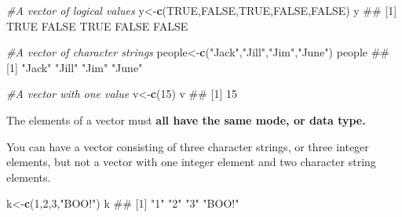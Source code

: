\documentclass[ignorenonframetext,]{beamer}
\newenvironment{Shaded}{\begin{snugshade}}{\end{snugshade}}
\newcommand{\KeywordTok}[1]{\textcolor[rgb]{0.13,0.29,0.53}{\textbf{#1}}}
\newcommand{\DecValTok}[1]{\textcolor[rgb]{0.00,0.00,0.81}{#1}}
\newcommand{\StringTok}[1]{\textcolor[rgb]{0.31,0.60,0.02}{#1}}
\newcommand{\CommentTok}[1]{\textcolor[rgb]{0.56,0.35,0.01}{\textit{#1}}}
\newcommand{\OtherTok}[1]{\textcolor[rgb]{0.56,0.35,0.01}{#1}}
\newcommand{\NormalTok}[1]{#1}
\begin{document}
\begin{frame}[fragile]

\begin{Shaded}
\begin{Highlighting}[]
\CommentTok{#A vector of logical values}
\NormalTok{y<-}\KeywordTok{c}\NormalTok{(}\OtherTok{TRUE}\NormalTok{,}\OtherTok{FALSE}\NormalTok{,}\OtherTok{TRUE}\NormalTok{,}\OtherTok{FALSE}\NormalTok{,}\OtherTok{FALSE}\NormalTok{)}
\NormalTok{y}
\NormalTok{## [1]  TRUE FALSE  TRUE FALSE FALSE}
\end{Highlighting}
\end{Shaded}

\begin{Shaded}
\begin{Highlighting}[]
\CommentTok{#A vector of character strings}
\NormalTok{people<-}\KeywordTok{c}\NormalTok{(}\StringTok{"Jack"}\NormalTok{,}\StringTok{"Jill"}\NormalTok{,}\StringTok{"Jim"}\NormalTok{,}\StringTok{"June"}\NormalTok{)}
\NormalTok{people}
\NormalTok{## [1] "Jack" "Jill" "Jim"  "June"}
\end{Highlighting}
\end{Shaded}

\begin{Shaded}
\begin{Highlighting}[]
\CommentTok{#A vector with one value}
\NormalTok{v<-}\KeywordTok{c}\NormalTok{(}\DecValTok{15}\NormalTok{)}
\NormalTok{v}
\NormalTok{## [1] 15}
\end{Highlighting}
\end{Shaded}

\end{frame}

\begin{frame}[fragile]

The elements of a vector must \textbf{all have the same mode, or data
type.}

You can have a vector consisting of three character strings, or three
integer elements, but not a vector with one integer element and two
character string elements.

\begin{Shaded}
\begin{Highlighting}[]
\NormalTok{k<-}\KeywordTok{c}\NormalTok{(}\DecValTok{1}\NormalTok{,}\DecValTok{2}\NormalTok{,}\DecValTok{3}\NormalTok{,}\StringTok{"BOO!"}\NormalTok{)}
\NormalTok{k}
\NormalTok{## [1] "1"    "2"    "3"    "BOO!"}
\end{Highlighting}
\end{Shaded}

\end{frame}
\end{document}
